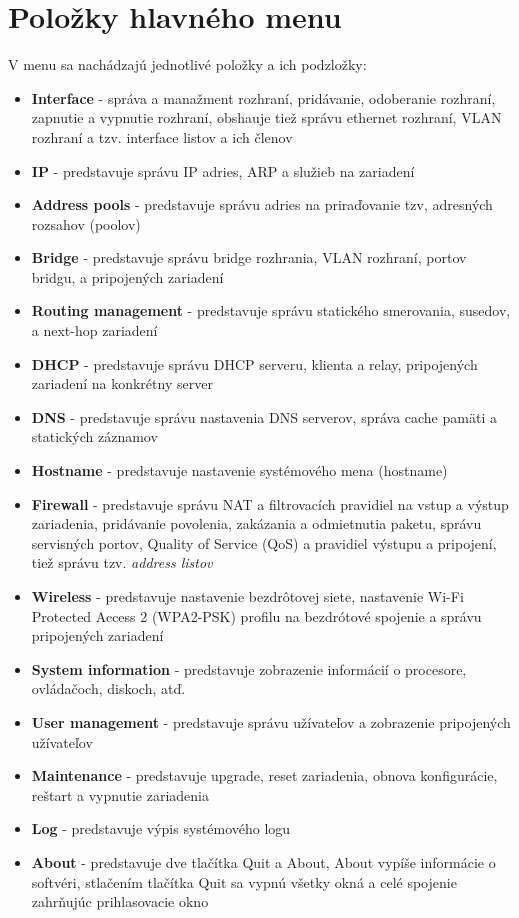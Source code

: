 \section{Položky hlavného menu}
\label{sec:buttons}
V menu sa nachádzajú jednotlivé položky a ich podzložky:
\begin{itemize}
\item \textbf{Interface} - správa a manažment rozhraní, pridávanie, odoberanie rozhraní, zapnutie a vypnutie rozhraní, obshauje tiež správu ethernet rozhraní, VLAN rozhraní a tzv. interface listov a ich členov
\item \textbf{IP} - predstavuje správu IP adries, ARP a služieb na zariadení
\item \textbf{Address pools} - predstavuje správu adries na priraďovanie tzv, adresných rozsahov (poolov)
\item \textbf{Bridge} - predstavuje správu bridge rozhrania, VLAN rozhraní, portov bridgu, a pripojených zariadení
\item \textbf{Routing management} - predstavuje správu statického smerovania, susedov, a next-hop zariadení
\item \textbf{DHCP} - predstavuje správu DHCP serveru, klienta a relay, pripojených zariadení na konkrétny server
\item \textbf{DNS} - predstavuje správu nastavenia DNS serverov, správa cache pamäti a statických záznamov
\item \textbf{Hostname} - predstavuje nastavenie systémového mena (hostname)
\item \textbf{Firewall} - predstavuje správu NAT a filtrovacích pravidiel na vstup a výstup zariadenia, pridávanie povolenia, zakázania  a odmietnutia paketu, správu servisných portov, Quality of Service (QoS) a pravidiel výstupu a pripojení, tiež správu tzv. \textit{address listov}
\item \textbf{Wireless} - predstavuje nastavenie bezdrôtovej siete, nastavenie Wi-Fi Protected Access 2 (WPA2-PSK) profilu na bezdrótové spojenie  a správu pripojených zariadení
\item  \textbf{System information} - predstavuje zobrazenie informácií o procesore,  ovládačoch, diskoch, atď.
\item \textbf{User management} - predstavuje správu užívateľov a zobrazenie pripojených užívateľov
\item \textbf{Maintenance} - predstavuje upgrade, reset zariadenia, obnova konfigurácie, reštart a vypnutie zariadenia
\item \textbf{Log} - predstavuje výpis systémového logu
\item \textbf{About} - predstavuje dve tlačítka Quit a About, About vypíše informácie o softvéri, stlačením tlačítka  Quit sa vypnú všetky okná a celé spojenie zahrňujúc prihlasovacie okno 
\end{itemize}
